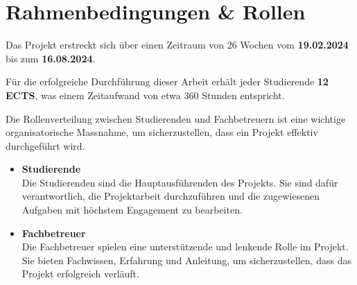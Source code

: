 \section{Rahmenbedingungen \& Rollen}
Das Projekt erstreckt sich über einen Zeitraum von 26 Wochen vom \textbf{19.02.2024} bis zum \textbf{16.08.2024}. 

Für die erfolgreiche Durchführung dieser Arbeit erhält jeder Studierende \textbf{12 ECTS}, was einem Zeitaufwand von etwa 360 Stunden entspricht. 

Die Rollenverteilung zwischen Studierenden und Fachbetreuern ist eine wichtige organisatorische Massnahme, um sicherzustellen, dass ein Projekt effektiv durchgeführt wird.

\begin{itemize}
    \item \textbf{Studierende} \\
    Die Studierenden sind die Hauptausführenden des Projekts. Sie sind dafür verantwortlich, die Projektarbeit durchzuführen und die zugewiesenen Aufgaben mit höchstem Engagement zu bearbeiten. 
    
    \item \textbf{Fachbetreuer} \\
    Die Fachbetreuer spielen eine unterstützende und lenkende Rolle im Projekt. Sie bieten Fachwissen, Erfahrung und Anleitung, um sicherzustellen, dass das Projekt erfolgreich verläuft. 
    
\end{itemize}